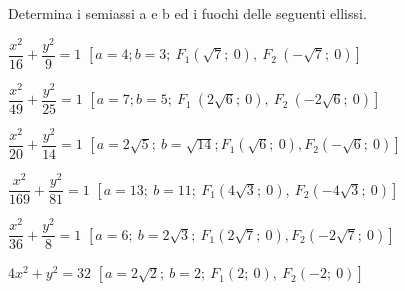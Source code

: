 \begin{esercizio}
  \label{ese:div.003}
  Determina i semiassi a e b ed i fuochi delle seguenti ellissi.
  \begin{enumeratea}
    \item \(\dfrac{x^{2}}{16} + \dfrac{y^{2}}{9} =1\) 
    \hfill
      \(\left[a=4; b=3;~F_{1} \left( 
\sqrt{7};~0\right),~F_{2}~\left(- \sqrt{7};~0\right)\right]\)
    \item \( \dfrac{x^{2}}{49} + \dfrac{y^{2}}{25} =1\)  
    \hfill
      \(\left[a=7; b=5;~F_{1}~\left(2 
\sqrt{6};~0\right),~F_{2}~\left(-2 \sqrt{6};~0\right)\right]\)
      \item \( \dfrac{x^{2}}{20} + \dfrac{y^{2}}{14} =1\)
      \hfill \(\left[a=2 \sqrt{5} ;~ b= \sqrt{14} ;  F_{1}  
\left(\sqrt{6} ;~ 0\right),  F_{2}  \left(-\sqrt{6} ;~0\right)\right]\)
      \item \( \dfrac{x^{2}}{169} + \dfrac{y^{2}}{81} =1\)
      \hfill \(\left[a=13 ;~b=11 ;~F_{1}  \left(4 \sqrt{3} 
;~0\right),~F_{2}  \left(-4 \sqrt{3} ;~0\right)\right]\)
      \item \( \dfrac{x^{2}}{36} + \dfrac{y^{2}}{8} =1\)
      \hfill \(\left[a=6 ;~b=2 \sqrt{3}  ;~F_{1}  \left(2 \sqrt{7} 
;~0\right),  F_{2}  \left(-2 \sqrt{7} ;~0\right)\right]\)
      
      \item  \(4 {x^{2}} +{y^{2}} =32\)
      \hfill \(\left[a=2 \sqrt{2}  ;~b=2 ;  ~F_{1}  (2;~0), ~ F_{2}  
(-2;~ 0)\right]\)
  \end{enumeratea}
\end{esercizio}

